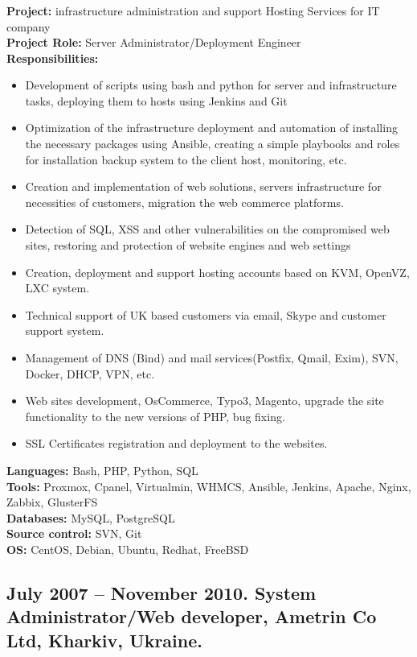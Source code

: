 \documentclass[letterpaper]{article}
\begin{document}
\subsubsection{}
\label{sec-2-1-1}
\textbf{Project:} infrastructure administration and support Hosting Services for IT company\\
\textbf{Project Role:}  Server Administrator/Deployment Engineer\\
\textbf{Responsibilities:}\\
\begin{itemize}
\item Development of scripts using bash and python for server and infrastructure tasks, deploying them to hosts using Jenkins and Git
\item Optimization of the infrastructure deployment and automation of installing the necessary packages using Ansible, creating a simple playbooks and roles for installation backup system to the client host, monitoring, etc.
\item Creation and implementation of web solutions, servers infrastructure for  necessities of customers, migration the web commerce platforms.
\item Detection of SQL, XSS and other vulnerabilities on the compromised web sites, restoring and protection of website engines and web settings
\item Creation, deployment and support hosting accounts based on KVM, OpenVZ, LXC system.
\item Technical support of UK based customers via email, Skype and customer support system.
\item Management of DNS (Bind) and mail services(Postfix, Qmail, Exim), SVN, Docker, DHCP, VPN, etc.
\item Web sites development, OsCommerce, Typo3, Magento, upgrade the site functionality to the new versions of PHP, bug fixing.
\item SSL Certificates registration and deployment to the websites.
\end{itemize}
\textbf{Languages:} Bash, PHP, Python,  SQL\\
\textbf{Tools:} Proxmox, Cpanel, Virtualmin, WHMCS, Ansible, Jenkins, Apache, Nginx, Zabbix, GlusterFS\\
\textbf{Databases:} MySQL, PostgreSQL\\
\textbf{Source control:} SVN, Git\\
\textbf{OS:} CentOS, Debian, Ubuntu, Redhat, FreeBSD\\
\subsection{July 2007 – November 2010. System Administrator/Web developer, Ametrin Co Ltd, Kharkiv, Ukraine.}
\label{sec-2-2}
\end{document}

